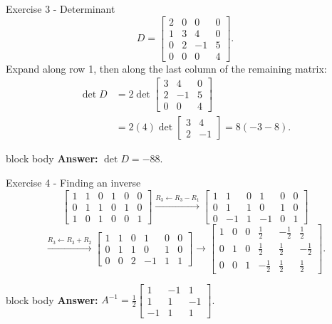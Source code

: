 \documentclass[aspectratio=169]{beamer}
\newcommand{\answerbox}[1]{%
  \begin{beamercolorbox}[sep=1.0ex,wd=\linewidth]{block body}
    \textbf{Answer:} #1
  \end{beamercolorbox}}
\begin{document}
\begin{frame}{Exercise 3 - Determinant}
\[
D=\begin{bmatrix}
2&0&0&0\\
1&3&4&0\\
0&2&-1&5\\
0&0&0&4
\end{bmatrix}.
\]
Expand along row 1, then along the last column of the remaining matrix:
\begin{align*}
\det D
&=2\det\begin{bmatrix}3&4&0\\2&-1&5\\0&0&4\end{bmatrix}\\
&=2(4)\det\begin{bmatrix}3&4\\2&-1\end{bmatrix}
=8(-3-8).
\end{align*}
\answerbox{$\boxed{\det D=-88}$.}
\end{frame}

\begin{frame}[shrink=4]{Exercise 4 - Finding an inverse}
\small
\[
\left[\begin{array}{ccc|ccc}
1&1&0&1&0&0\\
0&1&1&0&1&0\\
1&0&1&0&0&1
\end{array}\right]
\xrightarrow{R_3\leftarrow R_3-R_1}
\left[\begin{array}{ccc|ccc}
1&1&0&1&0&0\\
0&1&1&0&1&0\\
0&-1&1&-1&0&1
\end{array}\right]
\]
\[
\xrightarrow{R_3\leftarrow R_3+R_2}
\left[\begin{array}{ccc|ccc}
1&1&0&1&0&0\\
0&1&1&0&1&0\\
0&0&2&-1&1&1
\end{array}\right]
\longrightarrow
\left[\begin{array}{ccc|ccc}
1&0&0&\frac12&-\frac12&\frac12\\
0&1&0&\frac12&\frac12&-\frac12\\
0&0&1&-\frac12&\frac12&\frac12
\end{array}\right].
\]
\answerbox{$\displaystyle \boxed{A^{-1}=\frac12\begin{bmatrix}1&-1&1\\1&1&-1\\-1&1&1\end{bmatrix}}$.}
\end{frame}
\end{document}
